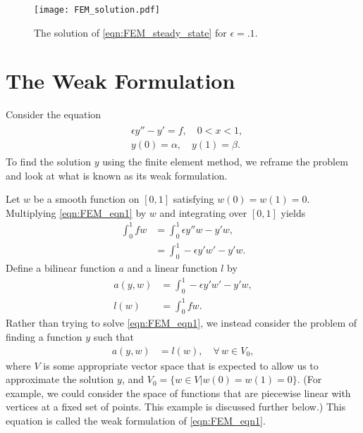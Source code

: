 
\begin{figure}[ht]
\centering
\texttt{[image: FEM\_solution.pdf]}
\caption{The solution of \eqref{eqn:FEM_steady_state} for $\epsilon = .1$.}
\label{fig:FEM_analytic_solution}
\end{figure}

\section*{The Weak Formulation}
Consider the equation
\begin{align}
	\begin{split}
	&{ }\epsilon y'' - y' = f, \quad 0 < x < 1,\\
	&{ }y(0) = \alpha, \quad y(1) = \beta .
	\end{split}\label{eqn:FEM_eqn1}
\end{align}
To find the solution $y$ using the finite element method, we reframe the problem and look at what is known as its weak formulation.

Let $w$ be a smooth function on $[0,1]$ satisfying $w(0) = w(1) = 0$.
Multiplying \eqref{eqn:FEM_eqn1} by $w$ and integrating over $[0,1]$ yields
\begin{align*}
	\int_0^1 f w &= \int_0^1 \epsilon y''w - y'w, \\
	&= \int_0^1 -\epsilon y'w' - y'w.
\end{align*}
Define a bilinear function $a$ and a linear function $l$ by
\begin{align*}
a(y,w) &= \int_0^1 -\epsilon y'w' - y'w,\\
l(w) &= \int_0^1 f w.
\end{align*}
Rather than trying to solve \eqref{eqn:FEM_eqn1}, we instead consider the problem of finding a function $y$ such that
\begin{align}
	a(y,w) &= l(w), \quad \forall \, w \in V_0,
	\label{eqn:FEM_integral_form}
\end{align}
where $V$ is some appropriate vector space that is expected to allow us to approximate the solution $y$, and $V_0 = \{w \in V|w(0) = w(1) = 0\}$.
(For example, we could consider the space of functions that are piecewise linear with vertices at a fixed set of points.
This example is discussed further below.)
This equation is called the weak formulation of \eqref{eqn:FEM_eqn1}.

